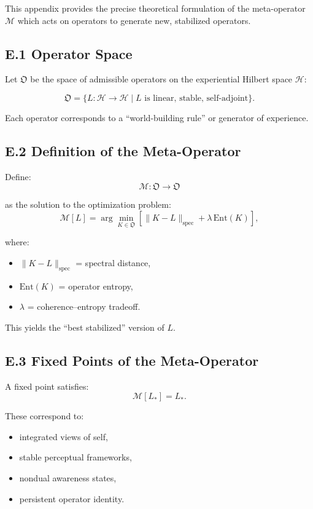 \documentclass[12pt]{article}
\begin{document}
This appendix provides the precise theoretical formulation of the meta-operator
$\mathcal{M}$ which acts on operators to generate new, stabilized operators.

\subsection*{E.1 Operator Space}

Let $\mathfrak O$ be the space of admissible operators on the experiential
Hilbert space $\mathcal{H}$:

\[
\mathfrak O = \{L : \mathcal{H} \to \mathcal{H} \mid L \text{ is linear, stable, self-adjoint}\}.
\]

Each operator corresponds to a ``world-building rule'' or generator of experience.

\subsection*{E.2 Definition of the Meta-Operator}

Define:
\[
\mathcal{M}: \mathfrak O \to \mathfrak O
\]

as the solution to the optimization problem:
\[
\mathcal{M}[L]
=
\arg\min_{K \in \mathfrak O}
\left[
\|K-L\|_{\text{spec}}
+
\lambda\, \mathrm{Ent}(K)
\right],
\]

where:
\begin{itemize}
\item $\|K-L\|_{\text{spec}}$ = spectral distance,
\item $\mathrm{Ent}(K)$ = operator entropy,
\item $\lambda$ = coherence–entropy tradeoff.
\end{itemize}

This yields the ``best stabilized'' version of $L$.

\subsection*{E.3 Fixed Points of the Meta-Operator}

A fixed point satisfies:
\[
\mathcal{M}[L_*] = L_*.
\]

These correspond to:
\begin{itemize}
\item integrated views of self,
\item stable perceptual frameworks,
\item nondual awareness states,
\item persistent operator identity.
\end{itemize}
\end{document}
